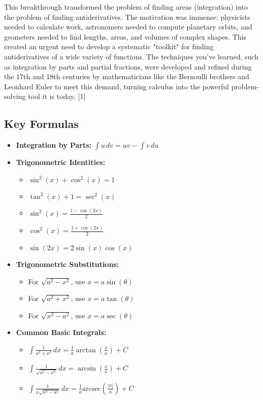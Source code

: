 \documentclass{article}
\begin{document}
This breakthrough transformed the problem of finding areas (integration) into the problem of finding antiderivatives. The motivation was immense: physicists needed to calculate work, astronomers needed to compute planetary orbits, and geometers needed to find lengths, areas, and volumes of complex shapes. This created an urgent need to develop a systematic "toolkit" for finding antiderivatives of a wide variety of functions. The techniques you've learned, such as integration by parts and partial fractions, were developed and refined during the 17th and 18th centuries by mathematicians like the Bernoulli brothers and Leonhard Euler to meet this demand, turning calculus into the powerful problem-solving tool it is today. [1]

\subsection{Key Formulas}
\begin{itemize}
    \item \textbf{Integration by Parts:} $\int u \, dv = uv - \int v \, du$
    \item \textbf{Trigonometric Identities:}
    \begin{itemize}
        \item $\sin^2(x) + \cos^2(x) = 1$
        \item $\tan^2(x) + 1 = \sec^2(x)$
        \item $\sin^2(x) = \frac{1 - \cos(2x)}{2}$
        \item $\cos^2(x) = \frac{1 + \cos(2x)}{2}$
        \item $\sin(2x) = 2\sin(x)\cos(x)$
    \end{itemize}
    \item \textbf{Trigonometric Substitutions:}
    \begin{itemize}
        \item For $\sqrt{a^2 - x^2}$, use $x = a\sin(\theta)$
        \item For $\sqrt{a^2 + x^2}$, use $x = a\tan(\theta)$
        \item For $\sqrt{x^2 - a^2}$, use $x = a\sec(\theta)$
    \end{itemize}
    \item \textbf{Common Basic Integrals:}
    \begin{itemize}
        \item $\int \frac{1}{a^2 + x^2} \, dx = \frac{1}{a}\arctan\left(\frac{x}{a}\right) + C$
        \item $\int \frac{1}{\sqrt{a^2 - x^2}} \, dx = \arcsin\left(\frac{x}{a}\right) + C$
        \item $\int \frac{1}{x\sqrt{x^2 - a^2}} \, dx = \frac{1}{a}\text{arcsec}\left(\frac{|x|}{a}\right) + C$
    \end{itemize}
\end{itemize}
\end{document}
